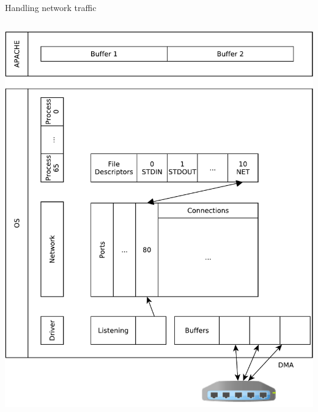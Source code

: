\documentclass{beamer}
\begin{document}
\begin{frame}[fragile]{Handling network traffic}
\begin{columns}
\begin{column}[t]{0.5\textwidth}
\begin{center}
{  \includegraphics[width=1\linewidth]{sock_mem_3}
     }
\end{center}
\end{column}
\end{columns}
\end{frame}
\end{document}
